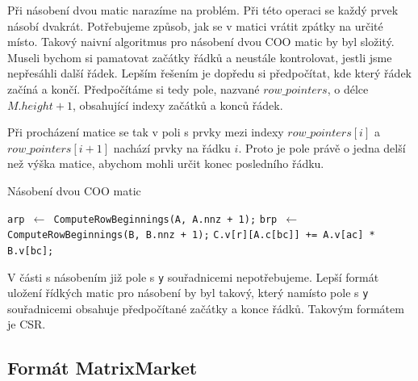 \label{alg:coo-mmm}
Při násobení dvou matic narazíme na problém. Při této operaci se každý prvek násobí dvakrát. Potřebujeme způsob, jak se v matici vrátit zpátky na určité místo. Takový naivní algoritmus pro násobení dvou COO matic by byl složitý. Museli bychom si pamatovat začátky řádků a neustále kontrolovat, jestli jsme nepřesáhli další řádek. Lepším řešením je dopředu si předpočítat, kde který řádek začíná a končí. Předpočítáme si tedy pole, nazvané $row\_pointers$, o délce $M.height + 1$, obsahující indexy začátků a konců řádek.

Při procházení matice se tak v poli s prvky mezi indexy $row\_pointers[i]$ a $row\_pointers[i+1]$ nachází prvky na řádku $i$. Proto je pole právě o jedna delší než výška matice, abychom mohli určit konec posledního řádku.

\begin{algorithm}[htb]
	\caption{Násobení dvou COO matic}\label{coo-mmm}
	\begin{algorithmic}[1]
		\State \texttt{arp $\gets$ ComputeRowBeginnings(A, A.nnz + 1);}
		\State \texttt{brp $\gets$ ComputeRowBeginnings(B, B.nnz + 1);}
					\State \texttt{C.v[r][A.c[bc]] += A.v[ac] * B.v[bc];}
				\EndFor
			\EndFor
		\EndFor
		\EndProcedure
	\end{algorithmic}
\end{algorithm}

V části s násobením již pole s \texttt{y} souřadnicemi nepotřebujeme. Lepší formát uložení řídkých matic pro násobení by byl takový, který namísto pole s \texttt{y} souřadnicemi obsahuje předpočítané začátky a konce řádků. Takovým formátem je CSR.


\subsection{Formát MatrixMarket}
\label{mtxsubsect}

